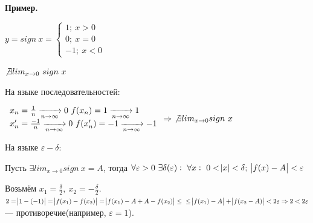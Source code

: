 \documentclass{article}
\begin{document}
  \textbf{Пример.}
  
  \(y=sign\ x=\begin{cases}1;\ x>0\\ 0;\ x=0\\ -1;\ x<0\end{cases}\)

  \(\not\exists lim_{x \rightarrow 0}\ sign\ x\)

  На языке последовательностей:

  \(
  \begin{array}{l}
    x_n = \frac{1}{n} \xrightarrow[n \rightarrow \infty]{} 0\ f(x_n)=1 \xrightarrow[n \rightarrow \infty]{} 1\\
    x_n' = \frac{-1}{n} \xrightarrow[n \rightarrow \infty]{} 0\ f(x_n')=-1 \xrightarrow[n \rightarrow \infty]{} -1
  \end{array} \Rightarrow
  \ \not\exists lim_{x \rightarrow 0} sign\ x
  \)

  На языке \(\varepsilon - \delta\):

  Пусть \(\exists lim_{x \rightarrow 0} sign\ x = A\), тогда \(\forall \varepsilon > 0\ \exists \delta(\varepsilon):\ \forall x:\ 0 < \abs{x} < \delta;\ \abs{f(x)-A}<\varepsilon\)

  Возьмём \(x_1 = \frac{\delta}{2},\ x_2 = -\frac{\delta}{2}\). \(2 = \abs{1 - (-1)} = \abs{f(x_1)-f(x_2)} = \abs{f(x_1)-A+A-f(x_2)} \leq\\ \leq \abs{f(x_1)-A}+\abs{f(x_2-A)} < 2 \varepsilon \Rightarrow 2 < 2\varepsilon\) --- противоречие(например, \(\varepsilon = 1\)).
\end{document}
